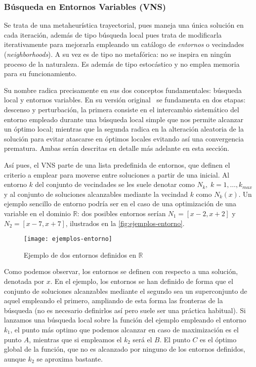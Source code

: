 \subsubsection{Búsqueda en Entornos Variables (VNS)} \label{sec:vns}
Se trata de una metaheurística trayectorial, pues maneja una única solución en cada iteración, además de tipo búsqueda local pues trata de modificarla iterativamente para mejorarla empleando un catálogo de \textit{entornos} o vecindades (\textit{neighborhoods}). A su vez es de tipo no metafórica: no se inspira en ningún proceso de la naturaleza. Es además de tipo estocástico y no emplea memoria para su funcionamiento.

Su nombre radica precisamente en sus dos conceptos fundamentales: búsqueda local y entornos variables. En su versión original~\cite{vns} se fundamenta en dos etapas: descenso y perturbación, la primera consiste en el intercambio sistemático del entorno empleado durante una búsqueda local simple que nos permite alcanzar un óptimo local; mientras que la segunda radica en la alteración aleatoria de la solución para evitar atascarse en óptimos locales evitando así una convergencia prematura. Ambas serán descritas en detalle más adelante en esta sección.

Así pues, el VNS parte de una lista predefinida de entornos, que definen el criterio a emplear para moverse entre soluciones a partir de una inicial. Al entorno $k$ del conjunto de vecindades se les suele denotar como $N_k, \; k=1,\dots,k_{max}$ y al conjunto de soluciones alcanzables mediante la vecindad $k$ como $N_k(x)$.
Un ejemplo sencillo de entorno podría ser en el caso de una optimización de una variable en el dominio $\mathbb{R}$: dos posibles entornos serían $N_1=[x-2, x+2]$ y $N_2=[x-7, x+7]$, ilustrados en la \autoref{fig:ejemplos-entorno}.

\begin{figure}[htbp]
    \centering
    \texttt{[image: ejemplos-entorno]}
    \caption{Ejemplo de dos entornos definidos en $\mathbb{R}$}
    \label{fig:ejemplos-entorno}
\end{figure}

Como podemos observar, los entornos se definen con respecto a una solución, denotada por $x$. En el ejemplo, los entornos se han definido de forma que el conjunto de soluciones alcanzables mediante el segundo sea un superconjunto de aquel empleando el primero, ampliando de esta forma las fronteras de la búsqueda (no es necesario definirlos así pero suele ser una práctica habitual). Si lanzamos una búsqueda local sobre la función del ejemplo empleando el entorno $k_1$, el punto más optimo que podemos alcanzar en caso de maximización es el punto $A$, mientras que si empleamos el $k_2$ será el $B$. El punto $C$ es el óptimo global de la función, que no es alcanzado por ninguno de los entornos definidos, aunque $k_2$ se aproxima bastante.

